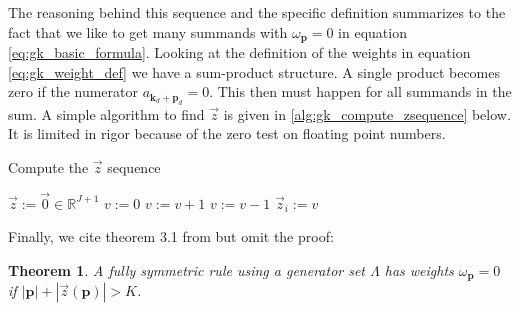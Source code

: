 \documentclass[a4paper,10pt]{article}
\newtheorem*{theorem*}{Theorem}
\begin{document}
The reasoning behind this sequence and the specific definition summarizes to
the fact that we like to get many summands with $\omega_{\mathbf{p}} = 0$ in
equation \eqref{eq:gk_basic_formula}. Looking at the definition of the weights
in equation \eqref{eq:gk_weight_def} we have a sum-product structure. A single
product becomes zero if the numerator $a_{\mathbf{k}_d+\mathbf{p}_d} = 0$. This
then must happen for all summands in the sum. A simple algorithm to find $\vec{z}$
is given in \ref{alg:gk_compute_zsequence} below. It is limited in rigor because
of the zero test on floating point numbers.

\begin{algorithm}[h!]
  \caption{Compute the $\vec{z}$ sequence}
  \label{alg:gk_compute_zsequence}
  \begin{algorithmic}
      \State $\vec{z} := \vec{0} \in \mathbb{R}^{J+1}$
      \State $v := 0$
            \State $v := v + 1$
          \EndWhile
        \Else
          \State $v := v - 1$
        \EndIf
        \State $\vec{z}_i := v$
      \EndFor
    \EndProcedure
  \end{algorithmic}
\end{algorithm}

Finally, we cite theorem 3.1 from \cite{genz} but omit the proof:

\begin{theorem*}
  \label{th:zero_weights}
  A fully symmetric rule using a generator set $\Lambda$ has weights $\omega_{\mathbf{p}} = 0$
  if $|\mathbf{p}| + |\vec{z}(\mathbf{p})| > K$.
\end{theorem*}
\end{document}
